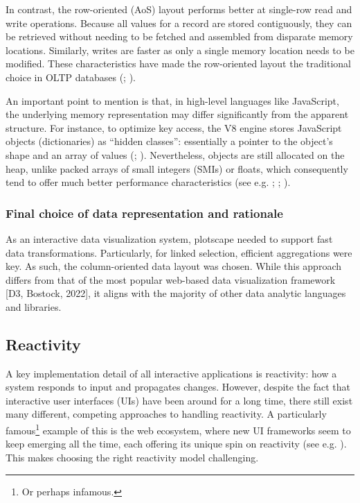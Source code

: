 \documentclass[
  openany]{book}
\theoremstyle{definition}
\theoremstyle{definition}
\theoremstyle{definition}
\theoremstyle{definition}
\theoremstyle{remark}
\begin{document}
In contrast, the row-oriented (AoS) layout performs better at single-row read and write operations. Because all values for a record are stored contiguously, they can be retrieved without needing to be fetched and assembled from disparate memory locations. Similarly, writes are faster as only a single memory location needs to be modified. These characteristics have made the row-oriented layout the traditional choice in OLTP databases (; ).

An important point to mention is that, in high-level languages like JavaScript, the underlying memory representation may differ significantly from the apparent structure. For instance, to optimize key access, the V8 engine stores JavaScript objects (dictionaries) as ``hidden classes'': essentially a pointer to the object's shape and an array of values (; ). Nevertheless, objects are still allocated on the heap, unlike packed arrays of small integers (SMIs) or floats, which consequently tend to offer much better performance characteristics (see e.g. ; ; ).

\subsubsection{Final choice of data representation and rationale}\label{final-choice-of-data-representation-and-rationale}

As an interactive data visualization system, plotscape needed to support fast data transformations. Particularly, for linked selection, efficient aggregations were key. As such, the column-oriented data layout was chosen. While this approach differs from that of the most popular web-based data visualization framework {[}D3, Bostock, 2022{]}, it aligns with the majority of other data analytic languages and libraries.

\subsection{Reactivity}\label{reactivity}

A key implementation detail of all interactive applications is reactivity: how a system responds to input and propagates changes. However, despite the fact that interactive user interfaces (UIs) have been around for a long time, there still exist many different, competing approaches to handling reactivity. A particularly famous\footnote{Or perhaps infamous.} example of this is the web ecosystem, where new UI frameworks seem to keep emerging all the time, each offering its unique spin on reactivity (see e.g. ). This makes choosing the right reactivity model challenging.
\end{document}
